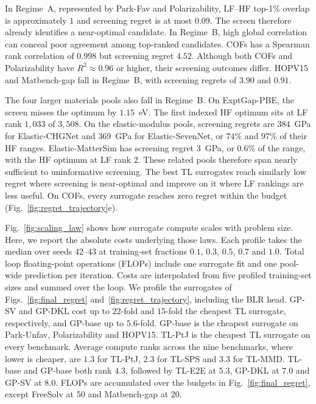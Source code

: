 In Regime~A, represented by Park-Fav and Polarizability, LF--HF top-1\% overlap is approximately $1$ and screening regret is at most $0.09$. The screen therefore already identifies a near-optimal candidate. In Regime~B, high global correlation can conceal poor agreement among top-ranked candidates. COFs has a Spearman rank correlation of $0.998$ but screening regret $4.52$. Although both COFs and Polarizability have $R^2 \approx 0.96$ or higher, their screening outcomes differ. HOPV15 and Matbench-gap fall in Regime~B, with screening regrets of $3.90$ and $0.91$.

The four larger materials pools also fall in Regime~B. On ExptGap-PBE, the screen misses the optimum by $1.15$~eV. The first indexed HF optimum sits at LF rank $1{,}033$ of $3{,}508$. On the elastic-modulus pools, screening regrets are $384$~GPa for Elastic-CHGNet and $369$~GPa for Elastic-SevenNet, or $74\%$ and $97\%$ of their HF ranges. Elastic-MatterSim has screening regret $3$~GPa, or $0.6\%$ of the range, with the HF optimum at LF rank 2. These related pools therefore span nearly sufficient to uninformative screening. The best TL surrogates reach similarly low regret where screening is near-optimal and improve on it where LF rankings are less useful. On COFs, every surrogate reaches zero regret within the budget (Fig.~\ref{fig:regret_trajectory}e).


Fig.~\ref{fig:scaling_law} shows how surrogate compute scales with problem size. Here, we report the absolute costs underlying those laws. Each profile takes the median over seeds 42--43 at training-set fractions $0.1$, $0.3$, $0.5$, $0.7$ and $1.0$. Total loop floating-point operations (FLOPs) include one surrogate fit and one pool-wide prediction per iteration. Costs are interpolated from five profiled training-set sizes and summed over the loop. We profile the surrogates of Figs.~\ref{fig:final_regret} and~\ref{fig:regret_trajectory}, including the BLR head. GP-SV and GP-DKL cost up to $22$-fold and $15$-fold the cheapest TL surrogate, respectively, and GP-base up to $5.6$-fold. GP-base is the cheapest surrogate on Park-Unfav, Polarizability and HOPV15. TL-PtJ is the cheapest TL surrogate on every benchmark. Average compute ranks across the nine benchmarks, where lower is cheaper, are $1.3$ for TL-PtJ, $2.3$ for TL-SPS and $3.3$ for TL-MMD. TL-base and GP-base both rank $4.3$, followed by TL-E2E at $5.3$, GP-DKL at $7.0$ and GP-SV at $8.0$. FLOPs are accumulated over the budgets in Fig.~\ref{fig:final_regret}, except FreeSolv at 50 and Matbench-gap at 20.

